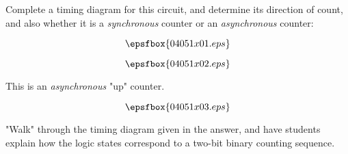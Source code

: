 

Complete a timing diagram for this circuit, and determine its direction of count, and also whether it is a {\it synchronous} counter or an {\it asynchronous} counter:

$$\epsfbox{04051x01.eps}$$

$$\epsfbox{04051x02.eps}$$







This is an {\it asynchronous} "up" counter.

$$\epsfbox{04051x03.eps}$$







"Walk" through the timing diagram given in the answer, and have students explain how the logic states correspond to a two-bit binary counting sequence.




